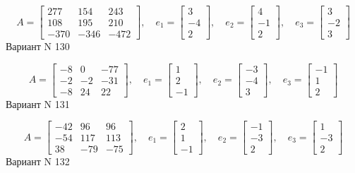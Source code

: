 \documentclass[11pt]{report}
\begin{document}
$$A = \left[\begin{matrix}277 & 154 & 243\\108 & 195 & 210\\-370 & -346 & -472\end{matrix}\right],\quad e_1 = \left[\begin{matrix}3\\-4\\2\end{matrix}\right],\quad e_2 = \left[\begin{matrix}4\\-1\\2\end{matrix}\right],\quad e_3 = \left[\begin{matrix}3\\-2\\3\end{matrix}\right]$$Вариант N 130

$$A = \left[\begin{matrix}-8 & 0 & -77\\-2 & -2 & -31\\-8 & 24 & 22\end{matrix}\right],\quad e_1 = \left[\begin{matrix}1\\2\\-1\end{matrix}\right],\quad e_2 = \left[\begin{matrix}-3\\-4\\3\end{matrix}\right],\quad e_3 = \left[\begin{matrix}-1\\1\\2\end{matrix}\right]$$Вариант N 131

$$A = \left[\begin{matrix}-42 & 96 & 96\\-54 & 117 & 113\\38 & -79 & -75\end{matrix}\right],\quad e_1 = \left[\begin{matrix}2\\1\\-1\end{matrix}\right],\quad e_2 = \left[\begin{matrix}-1\\-3\\2\end{matrix}\right],\quad e_3 = \left[\begin{matrix}1\\-3\\2\end{matrix}\right]$$Вариант N 132
\end{document}
